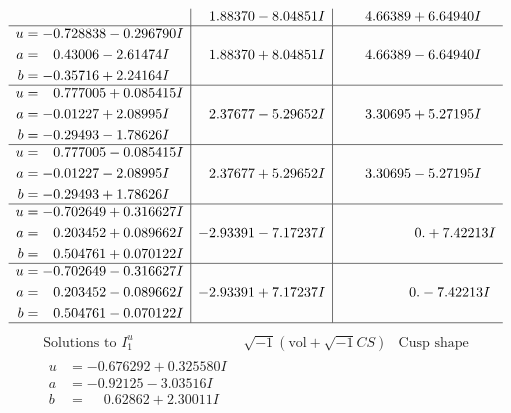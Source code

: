 \documentclass[1p]{elsarticle_modified}
\theoremstyle{definition}
\newcommand{\I}{\sqrt{-1}}
\begin{document}
$$\begin{array}{c|c|c}
 & \phantom{-}1.88370 - 8.04851 I & \phantom{-}4.66389 + 6.64940 I \\ \hline\begin{aligned}
u &= -0.728838 - 0.296790 I \\
a &= \phantom{-}0.43006 - 2.61474 I \\
b &= -0.35716 + 2.24164 I\end{aligned}
 & \phantom{-}1.88370 + 8.04851 I & \phantom{-}4.66389 - 6.64940 I \\ \hline\begin{aligned}
u &= \phantom{-}0.777005 + 0.085415 I \\
a &= -0.01227 + 2.08995 I \\
b &= -0.29493 - 1.78626 I\end{aligned}
 & \phantom{-}2.37677 - 5.29652 I & \phantom{-}3.30695 + 5.27195 I \\ \hline\begin{aligned}
u &= \phantom{-}0.777005 - 0.085415 I \\
a &= -0.01227 - 2.08995 I \\
b &= -0.29493 + 1.78626 I\end{aligned}
 & \phantom{-}2.37677 + 5.29652 I & \phantom{-}3.30695 - 5.27195 I \\ \hline\begin{aligned}
u &= -0.702649 + 0.316627 I \\
a &= \phantom{-}0.203452 + 0.089662 I \\
b &= \phantom{-}0.504761 + 0.070122 I\end{aligned}
 & -2.93391 - 7.17237 I & \phantom{-0.000000 -}0. + 7.42213 I \\ \hline\begin{aligned}
u &= -0.702649 - 0.316627 I \\
a &= \phantom{-}0.203452 - 0.089662 I \\
b &= \phantom{-}0.504761 - 0.070122 I\end{aligned}
 & -2.93391 + 7.17237 I & \phantom{-0.000000 } 0. - 7.42213 I\\
 \hline 
 \end{array}$$\newpage$$\begin{array}{c|c|c}  
\text{Solutions to }I^u_{1}& \I (\text{vol} + \sqrt{-1}CS) & \text{Cusp shape}\\
 \hline 
\begin{aligned}
u &= -0.676292 + 0.325580 I \\
a &= -0.92125 - 3.03516 I \\
b &= \phantom{-}0.62862 + 2.30011 I\end{aligned}

\end{array}$$
\end{document}
